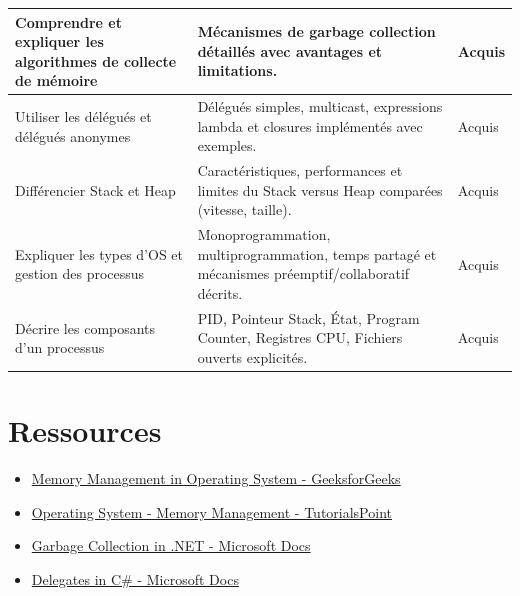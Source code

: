 \begin{center}
\begin{tabular}{|p{}|p{}|m{}|}
Comprendre et expliquer les algorithmes de collecte de mémoire &
Mécanismes de garbage collection détaillés avec avantages et limitations. &
{\color{green!60!black}Acquis} \\ \hline

Utiliser les délégués et délégués anonymes &
Délégués simples, multicast, expressions lambda et closures implémentés avec exemples. &
{\color{green!60!black}Acquis} \\ \hline

Différencier Stack et Heap &
Caractéristiques, performances et limites du Stack versus Heap comparées (vitesse, taille). &
{\color{green!60!black}Acquis} \\ \hline

Expliquer les types d'OS et gestion des processus &
Monoprogrammation, multiprogrammation, temps partagé et mécanismes préemptif/collaboratif décrits. &
{\color{green!60!black}Acquis} \\ \hline

Décrire les composants d'un processus &
PID, Pointeur Stack, État, Program Counter, Registres CPU, Fichiers ouverts explicités. &
{\color{green!60!black}Acquis} \\ \hline

\end{tabular}
\end{center}

\section*{Ressources}

\begin{itemize}
	\item \href{https://www.geeksforgeeks.org/memory-management-in-operating-system/}{Memory Management in Operating System - GeeksforGeeks}
	\item \href{https://www.tutorialspoint.com/operating_system/os_memory_management.htm}{Operating System - Memory Management - TutorialsPoint}
	\item \href{https://docs.microsoft.com/en-us/dotnet/standard/garbage-collection/}{Garbage Collection in .NET - Microsoft Docs}
	\item \href{https://docs.microsoft.com/en-us/dotnet/csharp/programming-guide/delegates/}{Delegates in C\# - Microsoft Docs}
\end{itemize}
